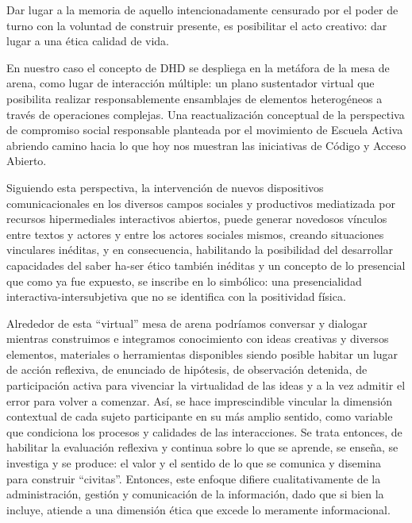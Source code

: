 %

Dar lugar a la memoria de aquello intencionadamente censurado por el poder de
turno con la voluntad de construir presente, es posibilitar el acto creativo:
dar lugar a una ética calidad de vida.

En nuestro caso el concepto de DHD se despliega en la metáfora de la
mesa de arena, como lugar de interacción múltiple: un plano sustentador
virtual que posibilita realizar responsablemente ensamblajes de elementos
heterogéneos a través de operaciones complejas. Una reactualización
conceptual de la perspectiva de compromiso social responsable planteada
por el movimiento de Escuela Activa abriendo camino hacia lo que hoy nos
muestran las iniciativas de Código y Acceso Abierto.

Siguiendo esta perspectiva, la intervención de nuevos dispositivos
comunicacionales en los diversos  campos  sociales  y productivos mediatizada
por recursos hipermediales interactivos abiertos, puede generar novedosos
vínculos entre textos y actores y entre los actores sociales  mismos,   
creando situaciones    vinculares   inéditas,  y en consecuencia, habilitando
la posibilidad del desarrollar capacidades del saber ha-ser ético también
inéditas y un concepto de lo presencial que como ya fue expuesto, se inscribe en
lo simbólico: una presencialidad interactiva-intersubjetiva que no se
identifica con la positividad física.

Alrededor de esta “virtual” mesa de arena podríamos conversar y
dialogar mientras construimos e integramos conocimiento con ideas
creativas y diversos elementos, materiales o herramientas disponibles
siendo posible habitar un lugar de acción reflexiva, de enunciado de
hipótesis, de observación detenida, de participación activa para vivenciar
la virtualidad de las ideas y a la vez admitir el error para volver a
comenzar. Así, se hace imprescindible vincular la dimensión contextual de
cada sujeto participante en su más amplio sentido, como variable que
condiciona los procesos y calidades de las interacciones. Se trata entonces,
de habilitar la evaluación reflexiva y continua sobre lo que se aprende, se
enseña, se investiga y se produce: el valor y el sentido de lo que se
comunica y disemina para construir “civitas”. Entonces, este enfoque
difiere cualitativamente de la administración, gestión y comunicación de la
información, dado que si bien la incluye, atiende a una dimensión ética que
excede lo meramente informacional.

